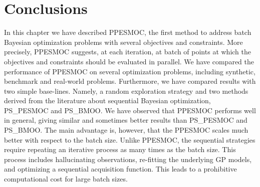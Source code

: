 \section{Conclusions} \label{seq-conclusions}

In this chapter we have described PPESMOC, the first
method to address batch Bayesian optimization problems
with several objectives and constraints. More precisely,
PPESMOC suggests, at each iteration, at batch of
points at which the objectives and constraints should
be evaluated in parallel. We have compared the performance of PPESMOC
on several optimization problems, including synthetic, benchmark and real-world problems.
Furthermore, we have compared results with two simple base-lines.
Namely, a random exploration strategy and two methods derived
from the literature about sequential Bayesian optimization,
PS\_PESMOC and PS\_BMOO. We have observed that PPESMOC performs
well in general, giving similar and sometimes better results than PS\_PESMOC and PS\_BMOO.
The main advantage is, however, that the PPESMOC scales much better
with respect to the batch size. Unlike PPESMOC, the sequential strategies
require repeating an iterative process as many times as the batch size.
This process includes hallucinating observations, re-fitting the underlying GP models,
and optimizing a sequential acquisition function. This leads to
a prohibitive computational cost for large batch sizes.
